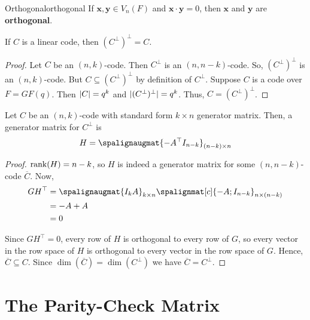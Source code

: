 
\begin{Definition}{Orthogonal}{orthogonal}
    If $ \bm{x},\bm{y}\in V_n(F) $ and $ \bm{x}\cdot \bm{y}=0 $, then
    $ \bm{x} $ and $ \bm{y} $ are \textbf{orthogonal}.
\end{Definition}

\begin{Theorem}{}{}
    If $ C $ is a linear code, then $ (C^{\perp})^{\perp}=C $.
\end{Theorem}

\begin{proof}
    Let $ C $ be an $ (n,k) $-code. Then $ C^{\perp} $ is an $ (n,n-k) $-code.
    So, $ (C^{\perp})^{\perp} $ is an $ (n,k) $-code. But
    $ C\subseteq (C^{\perp})^{\perp} $ by definition of $ C^{\perp} $.
    Suppose $ C $ is a code over $ F=GF(q) $. Then $ \lvert C\rvert=q^k $
    and $ \lvert(C^{\perp})^{\perp}\rvert=q^k $. Thus, $ C=(C^{\perp})^{\perp} $.
\end{proof}

\begin{Theorem}{}{}
    Let $ C $ be an $ (n,k) $-code with standard form $ k\times n $ generator matrix.
    Then, a generator matrix for $ C^{\perp} $ is
    \[ H=\spalignaugmat{-A^{\top} I_{n-k}}_{(n-k)\times n} \]
\end{Theorem}

\begin{proof}
    $ \operatorname{rank}(H)=n-k $, so $ H $ is indeed a generator matrix for some $ (n,n-k) $-code
    $ \overline{C} $. Now,
    \begin{align*}
        GH^{\top}
         & = \spalignaugmat{I_k A}_{k\times n}\spalignmat[c]{-A; I_{n-k}}_{n\times(n-k)} \\
         & =-A+A                                                                         \\
         & =0
    \end{align*}

    Since $ GH^{\top}=0 $, every row of $ H $ is orthogonal to every row of $ G $,
    so every vector in the row space of $ H $ is orthogonal to every vector in
    the row space of $ G $. Hence, $ \overline{C}\subseteq C $. Since
    $ \dim(\overline{C})=\dim(C^{\perp}) $ we have $ \overline{C}=C^{\perp} $.
\end{proof}

\section{The Parity-Check Matrix}

